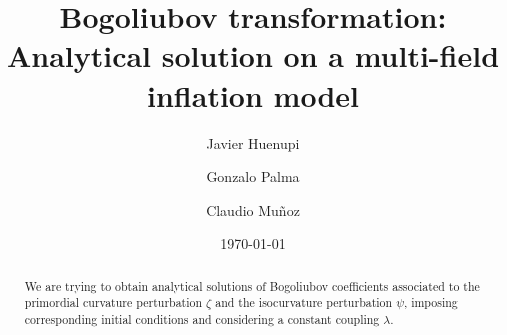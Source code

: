 \documentclass[%
 aip,
 jmp,%
 amsmath,amssymb,
 reprint,%
]{revtex4-2}
\begin{document}

\title[Bogoliubov transformation]{Bogoliubov transformation:\\ Analytical solution on a multi-field inflation model}%

\author{Javier Huenupi}
\author{Gonzalo Palma}
%
\author{Claudio Muñoz}%
%





\date{\today}%

\begin{abstract}
%

We are trying to obtain analytical solutions of Bogoliubov coefficients associated to the primordial curvature perturbation $\zeta$ and the isocurvature perturbation $\psi$, imposing corresponding initial conditions and considering a constant coupling $\lambda$.
\end{abstract}

\maketitle

\newcommand{\z}{\zeta}
\newcommand{\p}{\psi}
\newcommand{\Pm}{\mathcal{P}}
\newcommand{\Mm}{\mathcal{M}}
\newcommand\myatop[2]{\left[{{#1}\atop#2}\right]}
\newcommand{\mycomment}[1]{}
\newcommand{\Le}{\mathcal{L}_\epsilon}
\end{document}
